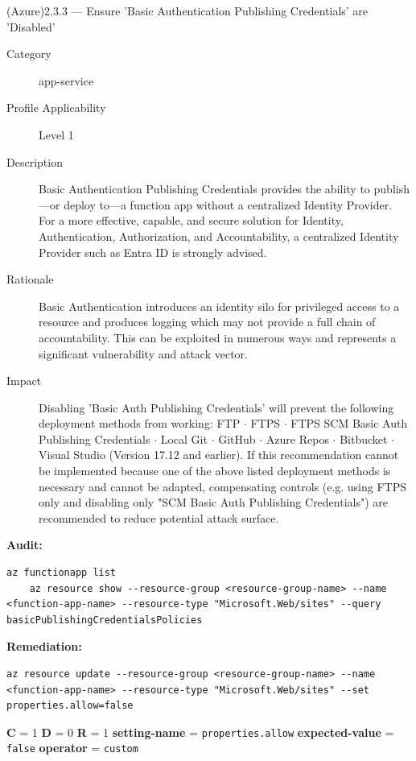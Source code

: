 \documentclass[a4paper,11pt]{report}
\begin{document}
\begin{datasetrow}{(Azure)2.3.3 --- Ensure 'Basic Authentication Publishing Credentials' are 'Disabled'}

\begin{description}
    \item[Category] app-service
    \item[Profile Applicability] Level 1
    \item[Description] Basic Authentication Publishing Credentials provides the ability to publish---or deploy to---a function app without a centralized Identity Provider. For a more effective, capable, and secure solution for Identity, Authentication, Authorization, and Accountability, a centralized Identity Provider such as Entra ID is strongly advised.
    \item[Rationale] Basic Authentication introduces an identity silo for privileged access to a resource and produces logging which may not provide a full chain of accountability. This can be exploited in numerous ways and represents a significant vulnerability and attack vector.
    \item[Impact] Disabling 'Basic Auth Publishing Credentials' will prevent the following deployment methods from working: FTP $\cdot$ FTPS $\cdot$ FTPS SCM Basic Auth Publishing Credentials $\cdot$ Local Git $\cdot$ GitHub $\cdot$ Azure Repos $\cdot$ Bitbucket $\cdot$ Visual Studio (Version 17.12 and earlier). If this recommendation cannot be implemented because one of the above listed deployment methods is necessary and cannot be adapted, compensating controls (e.g. using FTPS only and disabling only "SCM Basic Auth Publishing Credentials") are recommended to reduce potential attack surface.
\end{description}
\vspace{2pt}
\noindent\textbf{Audit:}
\begin{lstlisting}[style=azcli]
    az functionapp list
    az resource show --resource-group <resource-group-name> --name <function-app-name> --resource-type "Microsoft.Web/sites" --query basicPublishingCredentialsPolicies
\end{lstlisting}

\noindent\textbf{Remediation:}
\begin{lstlisting}[style=azcli]
az resource update --resource-group <resource-group-name> --name <function-app-name> --resource-type "Microsoft.Web/sites" --set properties.allow=false
\end{lstlisting}

\vspace{4pt}
\noindent
\textbf{C} = 1 \quad
\textbf{D} = 0 \quad
\textbf{R} = 1 \quad
\textbf{setting-name} = \texttt{properties.allow} \quad
\textbf{expected-value} = \texttt{false} \quad
\textbf{operator} = \texttt{custom}

\end{datasetrow}
\end{document}
